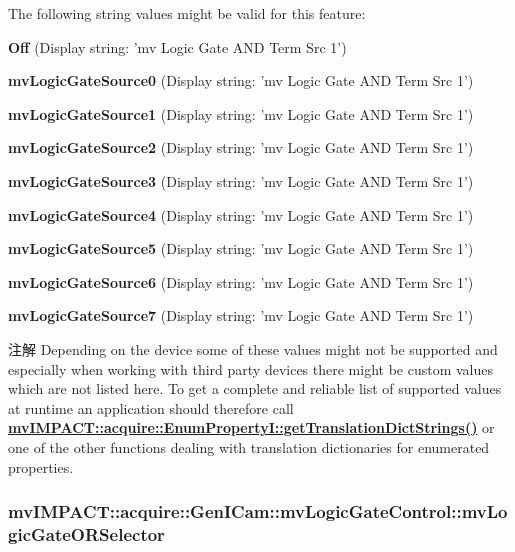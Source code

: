 The following string values might be valid for this feature\+:
\begin{DoxyItemize}
\item {\bfseries Off} (Display string\+: 'mv Logic Gate A\+N\+D Term Src 1')
\item {\bfseries mv\+Logic\+Gate\+Source0} (Display string\+: 'mv Logic Gate A\+N\+D Term Src 1')
\item {\bfseries mv\+Logic\+Gate\+Source1} (Display string\+: 'mv Logic Gate A\+N\+D Term Src 1')
\item {\bfseries mv\+Logic\+Gate\+Source2} (Display string\+: 'mv Logic Gate A\+N\+D Term Src 1')
\item {\bfseries mv\+Logic\+Gate\+Source3} (Display string\+: 'mv Logic Gate A\+N\+D Term Src 1')
\item {\bfseries mv\+Logic\+Gate\+Source4} (Display string\+: 'mv Logic Gate A\+N\+D Term Src 1')
\item {\bfseries mv\+Logic\+Gate\+Source5} (Display string\+: 'mv Logic Gate A\+N\+D Term Src 1')
\item {\bfseries mv\+Logic\+Gate\+Source6} (Display string\+: 'mv Logic Gate A\+N\+D Term Src 1')
\item {\bfseries mv\+Logic\+Gate\+Source7} (Display string\+: 'mv Logic Gate A\+N\+D Term Src 1')
\end{DoxyItemize}

\begin{DoxyNote}{注解}
Depending on the device some of these values might not be supported and especially when working with third party devices there might be custom values which are not listed here. To get a complete and reliable list of supported values at runtime an application should therefore call {\bfseries \hyperlink{classmv_i_m_p_a_c_t_1_1acquire_1_1_enum_property_i_a0ba6ccbf5ee69784d5d0b537924d26b6}{mv\+I\+M\+P\+A\+C\+T\+::acquire\+::\+Enum\+Property\+I\+::get\+Translation\+Dict\+Strings()}} or one of the other functions dealing with translation dictionaries for enumerated properties. 
\end{DoxyNote}
\hypertarget{classmv_i_m_p_a_c_t_1_1acquire_1_1_gen_i_cam_1_1mv_logic_gate_control_ad9652a51b62c599a9301d99d9fb5452d}{
\subsubsection[{mv\+Logic\+Gate\+O\+R\+Selector}]{ mv\+I\+M\+P\+A\+C\+T\+::acquire\+::\+Gen\+I\+Cam\+::mv\+Logic\+Gate\+Control\+::mv\+Logic\+Gate\+O\+R\+Selector}}\label{classmv_i_m_p_a_c_t_1_1acquire_1_1_gen_i_cam_1_1mv_logic_gate_control_ad9652a51b62c599a9301d99d9fb5452d}


